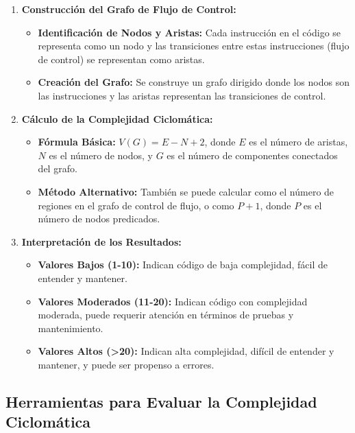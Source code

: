 \documentclass[10pt,authoryear,onecolumn]{article}
\begin{document}
\begin{enumerate}
    \item \textbf{Construcción del Grafo de Flujo de Control:}
    \begin{itemize}
        \item \textbf{Identificación de Nodos y Aristas:} Cada instrucción en el código se representa como un nodo y las transiciones entre estas instrucciones (flujo de control) se representan como aristas.
        \item \textbf{Creación del Grafo:} Se construye un grafo dirigido donde los nodos son las instrucciones y las aristas representan las transiciones de control.
    \end{itemize}
    \item \textbf{Cálculo de la Complejidad Ciclomática:}
    \begin{itemize}
        \item \textbf{Fórmula Básica:} \( V(G) = E - N + 2 \), donde \( E \) es el número de aristas, \( N \) es el número de nodos, y \( G \) es el número de componentes conectados del grafo.
        \item \textbf{Método Alternativo:} También se puede calcular como el número de regiones en el grafo de control de flujo, o como \( P + 1 \), donde \( P \) es el número de nodos predicados.
    \end{itemize}
    \item \textbf{Interpretación de los Resultados:}
    \begin{itemize}
        \item \textbf{Valores Bajos (1-10):} Indican código de baja complejidad, fácil de entender y mantener.
        \item \textbf{Valores Moderados (11-20):} Indican código con complejidad moderada, puede requerir atención en términos de pruebas y mantenimiento.
        \item \textbf{Valores Altos (>20):} Indican alta complejidad, difícil de entender y mantener, y puede ser propenso a errores.
    \end{itemize}
\end{enumerate}

\subsection{Herramientas para Evaluar la Complejidad Ciclomática}
\end{document}
